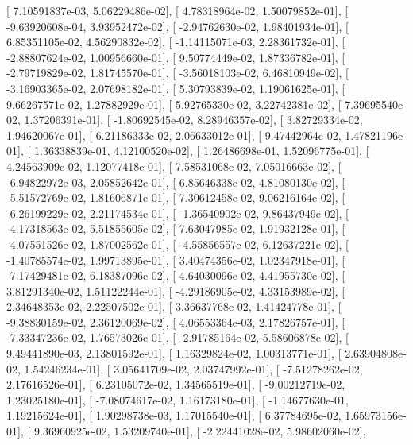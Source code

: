\documentclass{article}
\begin{document}
       [  7.10591837e-03,   5.06229486e-02],
       [  4.78318964e-02,   1.50079852e-01],
       [ -9.63920608e-04,   3.93952472e-02],
       [ -2.94762630e-02,   1.98401934e-01],
       [  6.85351105e-02,   4.56290832e-02],
       [ -1.14115071e-03,   2.28361732e-01],
       [ -2.88807624e-02,   1.00956660e-01],
       [  9.50774449e-02,   1.87336782e-01],
       [ -2.79719829e-02,   1.81745570e-01],
       [ -3.56018103e-02,   6.46810949e-02],
       [ -3.16903365e-02,   2.07698182e-01],
       [  5.30793839e-02,   1.19061625e-01],
       [  9.66267571e-02,   1.27882929e-01],
       [  5.92765330e-02,   3.22742381e-02],
       [  7.39695540e-02,   1.37206391e-01],
       [ -1.80692545e-02,   8.28946357e-02],
       [  3.82729334e-02,   1.94620067e-01],
       [  6.21186333e-02,   2.06633012e-01],
       [  9.47442964e-02,   1.47821196e-01],
       [  1.36338839e-01,   4.12100520e-02],
       [  1.26486698e-01,   1.52096775e-01],
       [  4.24563909e-02,   1.12077418e-01],
       [  7.58531068e-02,   7.05016663e-02],
       [ -6.94822972e-03,   2.05852642e-01],
       [  6.85646338e-02,   4.81080130e-02],
       [ -5.51572769e-02,   1.81606871e-01],
       [  7.30612458e-02,   9.06216164e-02],
       [ -6.26199229e-02,   2.21174534e-01],
       [ -1.36540902e-02,   9.86437949e-02],
       [ -4.17318563e-02,   5.51855605e-02],
       [  7.63047985e-02,   1.91932128e-01],
       [ -4.07551526e-02,   1.87002562e-01],
       [ -4.55856557e-02,   6.12637221e-02],
       [ -1.40785574e-02,   1.99713895e-01],
       [  3.40474356e-02,   1.02347918e-01],
       [ -7.17429481e-02,   6.18387096e-02],
       [  4.64030096e-02,   4.41955730e-02],
       [  3.81291340e-02,   1.51122244e-01],
       [ -4.29186905e-02,   4.33153989e-02],
       [  2.34648353e-02,   2.22507502e-01],
       [  3.36637768e-02,   1.41424778e-01],
       [ -9.38830159e-02,   2.36120069e-02],
       [  4.06553364e-03,   2.17826757e-01],
       [ -7.33347236e-02,   1.76573026e-01],
       [ -2.91785164e-02,   5.58606878e-02],
       [  9.49441890e-03,   2.13801592e-01],
       [  1.16329824e-02,   1.00313771e-01],
       [  2.63904808e-02,   1.54246234e-01],
       [  3.05641709e-02,   2.03747992e-01],
       [ -7.51278262e-02,   2.17616526e-01],
       [  6.23105072e-02,   1.34565519e-01],
       [ -9.00212719e-02,   1.23025180e-01],
       [ -7.08074617e-02,   1.16173180e-01],
       [ -1.14677630e-01,   1.19215624e-01],
       [  1.90298738e-03,   1.17015540e-01],
       [  6.37784695e-02,   1.65973156e-01],
       [  9.36960925e-02,   1.53209740e-01],
       [ -2.22441028e-02,   5.98602060e-02],
\end{document}
